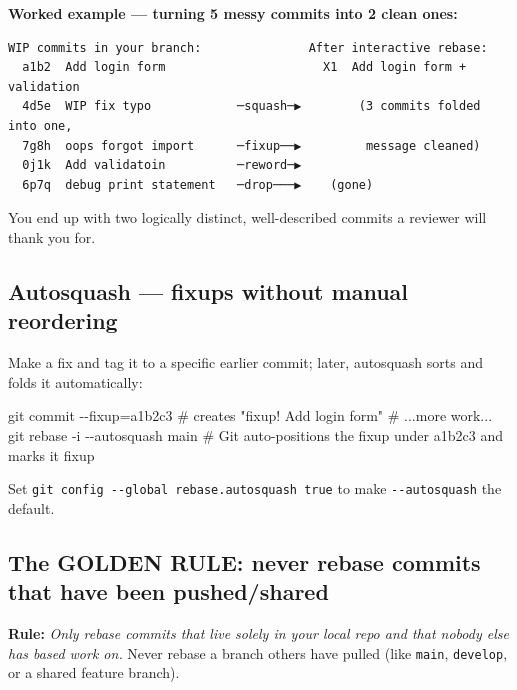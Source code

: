 \documentclass[11pt]{article}
\newenvironment{Shaded}{\begin{snugshade}}{\end{snugshade}}
\newcommand{\AttributeTok}[1]{\textcolor[rgb]{0.16,0.50,0.73}{#1}}
\newcommand{\CommentTok}[1]{\textcolor[rgb]{0.48,0.49,0.49}{#1}}
\newcommand{\FunctionTok}[1]{\textcolor[rgb]{0.56,0.27,0.68}{#1}}
\newcommand{\NormalTok}[1]{\textcolor[rgb]{0.81,0.81,0.76}{#1}}
\newcommand{\OperatorTok}[1]{\textcolor[rgb]{0.81,0.81,0.76}{#1}}
\begin{document}
\textbf{Worked example --- turning 5 messy commits into 2 clean ones:}

\setcodelang{}

\begin{verbatim}
WIP commits in your branch:               After interactive rebase:
  a1b2  Add login form                      X1  Add login form + validation
  4d5e  WIP fix typo            ─squash─▶        (3 commits folded into one,
  7g8h  oops forgot import      ─fixup──▶         message cleaned)
  0j1k  Add validatoin          ─reword─▶
  6p7q  debug print statement   ─drop───▶    (gone)
\end{verbatim}

You end up with two logically distinct, well-described commits a reviewer will thank you for.

\subsection{Autosquash --- fixups without manual reordering}\label{autosquash--fixups-without-manual-reordering}

Make a fix and tag it to a specific earlier commit; later, autosquash sorts and folds it automatically:


\begin{Shaded}
\begin{Highlighting}[]
\FunctionTok{git}\NormalTok{ commit }\AttributeTok{{-}{-}fixup}\OperatorTok{=}\NormalTok{a1b2c3        }\CommentTok{\# creates "fixup! Add login form"}
\CommentTok{\# ...more work...}
\FunctionTok{git}\NormalTok{ rebase }\AttributeTok{{-}i} \AttributeTok{{-}{-}autosquash}\NormalTok{ main  }\CommentTok{\# Git auto{-}positions the fixup under a1b2c3 and marks it \textquotesingle{}fixup\textquotesingle{}}
\end{Highlighting}
\end{Shaded}

Set \texttt{git\ config\ -\/-global\ rebase.autosquash\ true} to make \texttt{-\/-autosquash} the default.

\subsection{The GOLDEN RULE: never rebase commits that have been pushed/shared}\label{the-golden-rule-never-rebase-commits-that-have-been-pushedshared}

\textbf{Rule:} \emph{Only rebase commits that live solely in your local repo and that nobody else has based work on.} Never rebase a branch others have pulled (like \texttt{main}, \texttt{develop}, or a shared feature branch).
\end{document}
